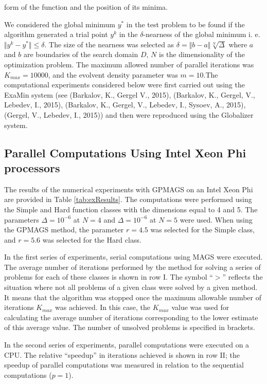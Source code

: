 \documentclass{gOMS2e}
\theoremstyle{plain}%
\theoremstyle{definition}
\theoremstyle{remark}
\begin{document}
form of the function and the position of its minima.
\par
We considered the global minimum \(y^*\) in the test problem to be found if the
algorithm generated a trial point \(y^k\) in the \(\delta\)-nearness of the global
minimum i. e. \(\Vert y^k-y^* \Vert \leqslant \delta\). The size of the nearness was
selected as \(\delta=\Vert b-a \Vert\sqrt[N]{\Delta}\) where \(a\) and \(b\) are
boundaries of the search domain \(D\), \(N\) is the dimensionality of the optimization problem.
The maximum allowed number of parallel iterations was \(K_{max} = 10000\), and the evolvent
density parameter was \(m=10\).The computational experiments considered below were first
carried out using the ExaMin system (see (Barkalov, K., Gergel V., 2015), (Barkalov, K., Gergel, V., Lebedev, I., 2015), (Barkalov, K., Gergel, V., Lebedev, I., Sysoev, A., 2015), (Gergel, V., Lebedev, I., 2015))
and then were reproduced using the Globalizer system.

\subsection{Parallel Computations Using Intel Xeon Phi processors}
The results of the numerical experiments with GPMAGS on an Intel Xeon Phi are provided in Table \ref{tab:exResults}.
The computations were performed using the Simple and Hard function classes with the
dimensions equal to 4 and 5. The parameters \(\Delta=10^{-6}\) at \(N=4\) and \(\Delta=10^{-6}\) at \(N=5\)
were used. When using the GPMAGS method, the parameter \(r=4.5\) was selected for the
Simple class, and \(r=5.6\) was selected for the Hard class.
\par
In the first series of experiments, serial computations using MAGS were executed.
The average number of iterations performed by the method for solving a series of
problems for each of these classes is shown in row I. The symbol ``\(>\)'' reflects the
situation where not all problems of a given class were solved by a given method.
It means that the algorithm was stopped once the maximum allowable number of
iterations \(K_{max}\) was achieved. In this case, the \(K_{max}\) value was used for
calculating the average number of iterations corresponding to the lower estimate of
this average value. The number of unsolved problems is specified in brackets.
\par
In the second series of experiments, parallel computations were executed on a CPU.
The relative ``speedup'' in iterations achieved is shown in row II; the speedup of
parallel computations was measured in relation to the sequential computations (\(p=1\)).
\end{document}
